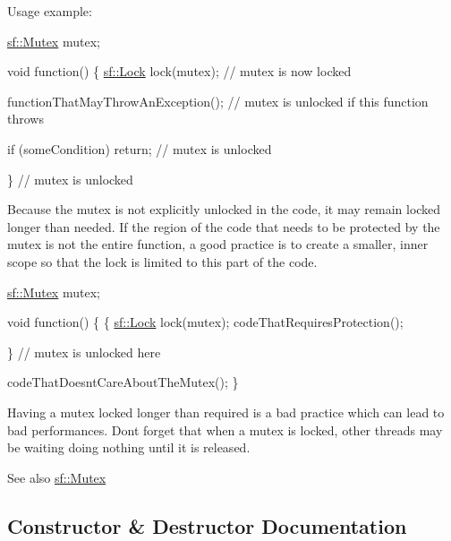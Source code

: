 Usage example\+: 
\begin{DoxyCode}
\hyperlink{classsf_1_1_mutex}{sf::Mutex} mutex;

\textcolor{keywordtype}{void} \textcolor{keyword}{function}()
\{
    \hyperlink{classsf_1_1_lock}{sf::Lock} lock(mutex); \textcolor{comment}{// mutex is now locked}

    functionThatMayThrowAnException(); \textcolor{comment}{// mutex is unlocked if this function throws}

    \textcolor{keywordflow}{if} (someCondition)
        \textcolor{keywordflow}{return}; \textcolor{comment}{// mutex is unlocked}

\} \textcolor{comment}{// mutex is unlocked}
\end{DoxyCode}


Because the mutex is not explicitly unlocked in the code, it may remain locked longer than needed. If the region of the code that needs to be protected by the mutex is not the entire function, a good practice is to create a smaller, inner scope so that the lock is limited to this part of the code.


\begin{DoxyCode}
\hyperlink{classsf_1_1_mutex}{sf::Mutex} mutex;

\textcolor{keywordtype}{void} \textcolor{keyword}{function}()
\{
    \{
      \hyperlink{classsf_1_1_lock}{sf::Lock} lock(mutex);
      codeThatRequiresProtection();

    \} \textcolor{comment}{// mutex is unlocked here}

    codeThatDoesntCareAboutTheMutex();
\}
\end{DoxyCode}


Having a mutex locked longer than required is a bad practice which can lead to bad performances. Don\textquotesingle{}t forget that when a mutex is locked, other threads may be waiting doing nothing until it is released.

\begin{DoxySeeAlso}{See also}
\hyperlink{classsf_1_1_mutex}{sf\+::\+Mutex} 
\end{DoxySeeAlso}


\subsection{Constructor \& Destructor Documentation}
\mbox{\label{classsf_1_1_lock_a1a4c5d7a15da61103d85c9aa7f118920}} 
